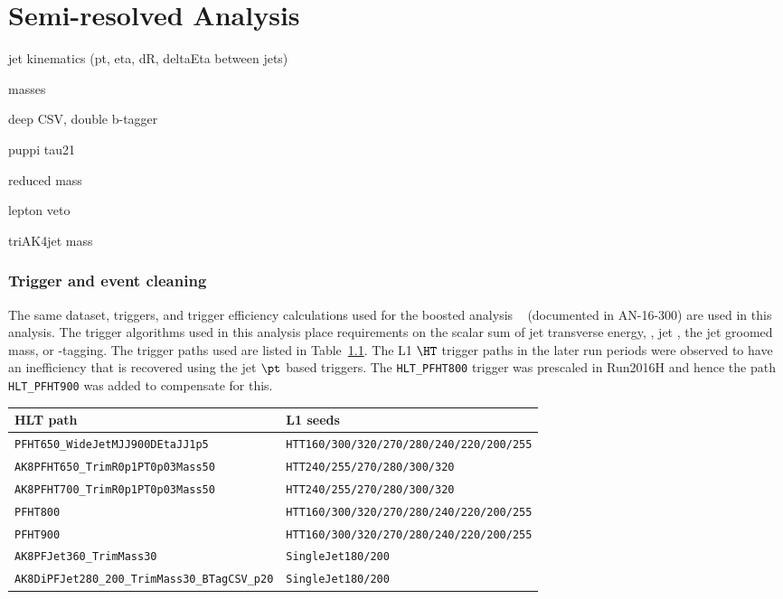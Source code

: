 \chapter{Semi-resolved Analysis}\label{Sec:Ana}

jet kinematics (pt, eta, dR, deltaEta between jets)

masses

deep CSV, double b-tagger

puppi tau21

reduced mass

lepton veto 

triAK4jet mass

\subsection{Trigger and event cleaning\label{ss:trigger}}

The same dataset, triggers, and trigger efficiency calculations used for the boosted analysis ~\cite{CMS-PAS-B2G-16-026} (documented in AN-16-300) are used in this analysis. The trigger algorithms used in this analysis place requirements on the scalar sum of jet transverse energy, \HT, jet \pt, the jet groomed mass, or \PQb-tagging. The trigger paths used are listed in Table~\ref{tab:trigpaths}. The L1 $\HT$ trigger paths in the later run periods were observed to have an inefficiency that is recovered using the jet $\pt$ based triggers. The \texttt{HLT\_PFHT800} trigger was prescaled in Run2016H and hence the path \texttt{HLT\_PFHT900} was added to compensate for this.

\begin{table} [htbH]\tiny
  \begin{center}
    \label{tab:trigpaths}
    \begin{tabular}{l|l}
      \hline
      HLT path & L1 seeds \\
      \hline
       \texttt{PFHT650\_WideJetMJJ900DEtaJJ1p5}              & \texttt{HTT160/300/320/270/280/240/220/200/255} \\  
       \texttt{AK8PFHT650\_TrimR0p1PT0p03Mass50}             & \texttt{HTT240/255/270/280/300/320} \\  
       \texttt{AK8PFHT700\_TrimR0p1PT0p03Mass50}             & \texttt{HTT240/255/270/280/300/320} \\
       \texttt{PFHT800}                                      & \texttt{HTT160/300/320/270/280/240/220/200/255} \\  
       \texttt{PFHT900}                                      & \texttt{HTT160/300/320/270/280/240/220/200/255} \\  
       \texttt{AK8PFJet360\_TrimMass30}                      & \texttt{SingleJet180/200} \\  
       \texttt{AK8DiPFJet280\_200\_TrimMass30\_BTagCSV\_p20} & \texttt{SingleJet180/200} \\   
      \hline
    \end{tabular}
  \end{center}
\end{table}

